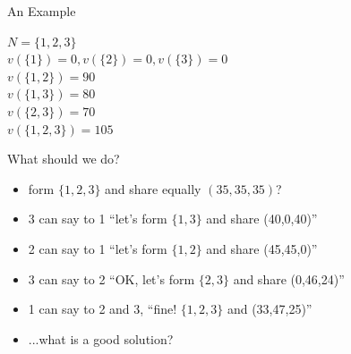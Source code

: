 \documentclass{beamer}
\begin{document}
\begin{frame}{An Example}

    \begin{center}
        $N = \{1,2,3\}$ \\
        $v(\{1\}) = 0, v(\{2\}) = 0, v(\{3\}) = 0$ \\
        $v(\{1,2\}) = 90$ \\ 
        $v(\{1,3\}) = 80$ \\ 
        $v(\{2,3\}) = 70$ \\
        $v(\{1,2,3\}) = 105$ \\
    \end{center}
    
    What should we do?
    \begin{itemize}
        \item form $\{1,2,3\}$ and share equally $(35,35,35)$?
        \item 3 can say to 1 ``let's form $\{1,3\}$ and share (40,0,40)''
        \item 2 can say to 1 ``let's form $\{1,2\}$ and share (45,45,0)''
        \item 3 can say to 2 ``OK, let's form $\{2,3\}$ and share (0,46,24)''
        \item 1 can say to 2 and 3, ``fine! $\{1,2,3\}$ and (33,47,25)''
        \item ...what is a good solution?
    \end{itemize}
    
\end{frame}

\end{document}
